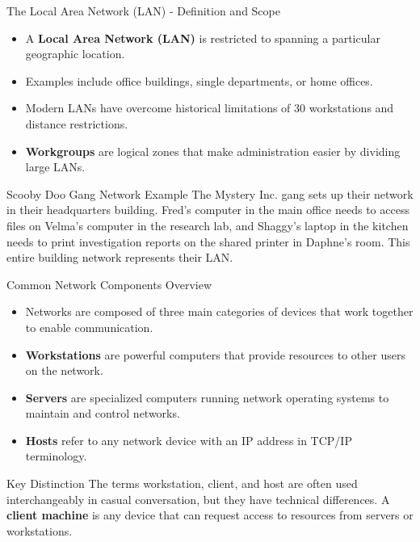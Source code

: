 \documentclass[aspectratio=169]{beamer}
\begin{document}
	\begin{frame}{The Local Area Network (LAN) - Definition and Scope}
		\begin{itemize}
			\item A \textbf{Local Area Network (LAN)} is restricted to spanning a particular geographic location.
			\item Examples include office buildings, single departments, or home offices.
			\item Modern LANs have overcome historical limitations of 30 workstations and distance restrictions.
			\item \textbf{Workgroups} are logical zones that make administration easier by dividing large LANs.
		\end{itemize}
		
		\begin{exampleblock}{Scooby Doo Gang Network Example}
			The Mystery Inc. gang sets up their network in their headquarters building. Fred's computer in the main office needs to access files on Velma's computer in the research lab, and Shaggy's laptop in the kitchen needs to print investigation reports on the shared printer in Daphne's room. This entire building network represents their LAN.
		\end{exampleblock}
	\end{frame}
	
	\begin{frame}{Common Network Components Overview}
		\begin{itemize}
			\item Networks are composed of three main categories of devices that work together to enable communication.
			\item \textbf{Workstations} are powerful computers that provide resources to other users on the network.
			\item \textbf{Servers} are specialized computers running network operating systems to maintain and control networks.
			\item \textbf{Hosts} refer to any network device with an IP address in TCP/IP terminology.
		\end{itemize}
		
		\begin{block}{Key Distinction}
			The terms workstation, client, and host are often used interchangeably in casual conversation, but they have technical differences. A \textbf{client machine} is any device that can request access to resources from servers or workstations.
		\end{block}
	\end{frame}
	
\end{document}

